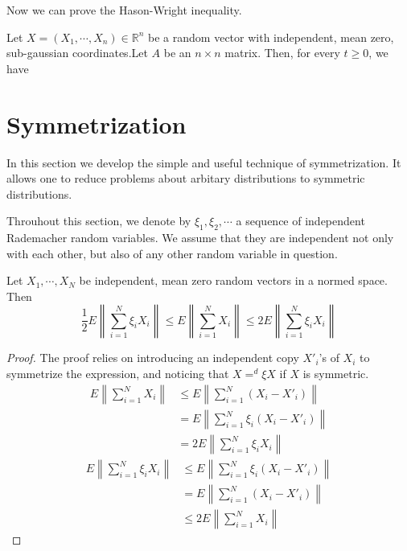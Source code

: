 Now we can prove the Hason-Wright inequality.
\begin{theorem}
    Let $X=(X_1,\cdots,X_n)\in \mathbb{R}^n$ be a random vector with independent, 
    mean zero, sub-gaussian coordinates.Let $A$ be an $n\times n$ matrix. Then, for every $t\geq 0$, we have 
    \[ \]
\end{theorem}

\section{Symmetrization}
In this section we develop the simple and useful technique of symmetrization.
It allows one to reduce problems about arbitary distributions to symmetric distributions.
\begin{definition}
    
\end{definition}
Throuhout this section, we denote by $\xi_1,\xi_2,\cdots$ a sequence of independent Rademacher random variables.
We assume that they are independent not only with each other, but also of any other random variable in question.
\begin{lemma}[symmetrization]
    Let $X_1,\cdots,X_N$ be independent, mean zero random vectors in a normed space. Then 
    \[\frac{1}{2}E\left\|\sum_{i=1}^N\xi_iX_i\right\|\le E\left\|\sum_{i=1}^NX_i\right\|\le 2E\left\|\sum_{i=1}^N\xi_iX_i\right\|\]
\end{lemma}
\begin{proof}
    The proof relies on introducing an independent copy $X'_i$'s of $X_i$ to symmetrize the expression,
    and noticing that $X=^d \xi X$ if $X$ is symmetric.
    \begin{align*}
        E\left\|\sum_{i=1}^NX_i\right\|&\le E\left\|\sum_{i=1}^N(X_i-X'_i)\right\|\\
        &=E\left\|\sum_{i=1}^N\xi_i(X_i-X'_i)\right\|\\
        &=2 E\left\|\sum_{i=1}^N\xi_iX_i\right\|
    \end{align*}
    \begin{align*}
        E\left\|\sum_{i=1}^N\xi_iX_i\right\|&\le E\left\|\sum_{i=1}^N\xi_i(X_i-X'_i)\right\|\\
        &=E\left\|\sum_{i=1}^N(X_i-X'_i)\right\|\\
        &\le 2E\left\|\sum_{i=1}^NX_i\right\|
    \end{align*}
        
\end{proof}


